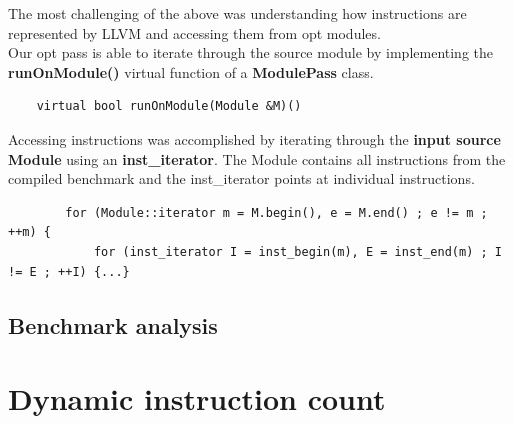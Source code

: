 \documentclass[letterpaper,twocolumn,10pt]{article}
\begin{document}
The most challenging of the above was understanding how instructions are represented by LLVM and accessing them from opt modules.\\

Our opt pass is able to iterate through the source module by implementing the \textbf{runOnModule()} virtual function of a \textbf{ModulePass} class.

\begin{frame}[fragile]
\begin{lstlisting}
    virtual bool runOnModule(Module &M)()
\end{lstlisting}
\end{frame}

Accessing instructions was accomplished by iterating through the \textbf{input source} \textbf{Module} using an \textbf{inst\_iterator}. The Module contains all instructions from the compiled benchmark and the inst\_iterator points at individual instructions.\\

\begin{frame}[fragile]
\begin{lstlisting}
    	for (Module::iterator m = M.begin(), e = M.end() ; e != m ; ++m) {
			for (inst_iterator I = inst_begin(m), E = inst_end(m) ; I != E ; ++I) {...}
\end{lstlisting}
\end{frame}


\subsection{Benchmark analysis}


\section{Dynamic instruction count}
\end{document}
